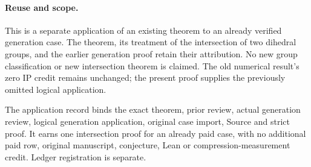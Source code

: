 \documentclass[11pt]{article}
\begin{document}
\paragraph{Reuse and scope.}
This is a separate application of an existing theorem to an already
verified generation case. The theorem, its treatment of the intersection
of two dihedral groups, and the earlier generation proof retain their
attribution. No new group classification or new intersection theorem is
claimed. The old numerical result's zero IP credit remains unchanged;
the present proof supplies the previously omitted logical application.

The application record binds the exact theorem, prior review, actual
generation review, logical generation application, original case import,
Source and strict proof. It earns one intersection proof for an already
paid case, with no additional paid row, original manuscript, conjecture,
Lean or compression-measurement credit. Ledger registration is separate.
\end{document}
